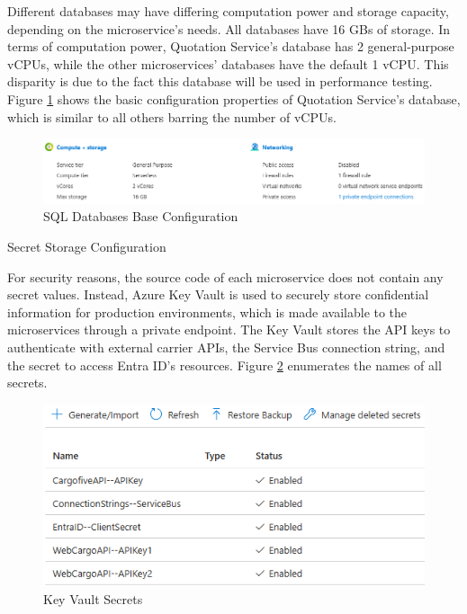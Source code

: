 \documentclass[12pt, reqno, oneside]{amsbook}
\makeatletter
\def\subsection{\@startsection{subsection}{2}%
      \z@{.5\linespacing\@plus.7\linespacing}{.25\linespacing}%
      {\normalfont\bfseries\flushleft}}
\theoremstyle{definition}
\theoremstyle{definition}
\numberwithin{section}{chapter}
\numberwithin{table}{chapter}
\numberwithin{figure}{chapter}
\makeatother
\begin{document}
Different databases may have differing computation power and storage capacity, depending on the microservice's needs. All databases have 16 \acp{GB} of storage. In terms of computation power, Quotation Service's database has 2 general-purpose \acp{vCPU}, while the other microservices' databases have the default 1 \ac{vCPU}. This disparity is due to the fact this database will be used in performance testing. Figure \ref{Figure:DatabaseConfigurationBase} shows the basic configuration properties of Quotation Service's database, which is similar to all others barring the number of \acp{vCPU}.

\begin{figure}[H]
  \centering
  \includegraphics[width=0.9\linewidth]{images/DatabaseConfigurationBase.png}
  \caption{\label{Figure:DatabaseConfigurationBase}SQL Databases Base Configuration}
\end{figure}

\subsection{Secret Storage Configuration}

For security reasons, the source code of each microservice does not contain any secret values. Instead, Azure Key Vault is used to securely store confidential information for production environments, which is made available to the microservices through a private endpoint. The Key Vault stores the \ac{API} keys to authenticate with external carrier \acp{API}, the Service Bus connection string, and the secret to access Entra ID's resources. Figure \ref{Figure:KeyVaultSecrets} enumerates the names of all secrets.

\begin{figure}[H]
  \centering
  \includegraphics[width=0.8\linewidth]{images/KeyVaultSecrets.png}
  \caption{\label{Figure:KeyVaultSecrets}Key Vault Secrets}
\end{figure}
\end{document}
